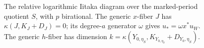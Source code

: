 \begin{figure}[ht]
\centering
{}
\caption{The relative logarithmic Iitaka diagram over the marked-period
quotient $S$, with $p$ birational.  The generic $x$-fiber $J$ has
$\kappa(J,K_J+D_J)=0$; its degree-$a$ generator $\omega$ gives
$u_*=\omega x^*u_W$.  The generic $h$-fiber has dimension
$k=\kappa(Y_{0,\eta_S},K_{Y_{0,\eta_S}}+D_{Y_0,\eta_S})$.}
\label{fig:intermediate-base}
\end{figure}
